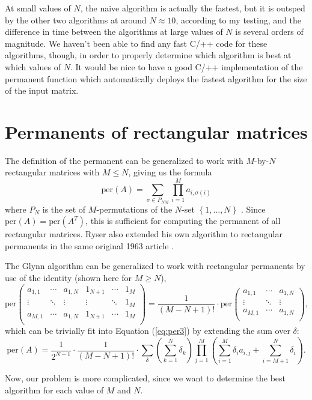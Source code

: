 \documentclass{article}
\begin{document}
At small values of $N$, the naive algorithm is actually the fastest, but it is outsped by the other
two algorithms at around $N \approx 10$, according to my testing, and the difference in time between
the algorithms at large values of $N$ is several orders of magnitude. We haven't been able to find
any fast C/++ code for these algorithms, though, in order to properly determine which algorithm is
best at which values of $N$. It would be nice to have a good C/++ implementation of the permanent
function which automatically deploys the fastest algorithm for the size of the input matrix.

\section*{Permanents of rectangular matrices}

The definition of the permanent can be generalized to work with $M$-by-$N$ rectangular
matrices with $M \leq N$, giving us the formula
\begin{equation} \label{eq:rectper1}
    \text{per}(A) = \sum_{\sigma \in P_{NM}}{\prod_{i=1}^M{a_{i,{\sigma(i)}}}}
\end{equation}
where $P_N$ is the set of $M$-permutations of the $N$-set $\left\{1,\dots,N\right\}$ \cite{wiki:permanent}.
Since $\text{per}(A) = \text{per}(A^T)$, this is sufficient for computing the permanent of all
rectangular matrices. Ryser also extended his own algorithm to rectangular permanents in the same
original 1963 article \cite{wiki:computing,ryser1963}.

The Glynn algorithm can be generalized to work with rectangular permanents by use of the
identity (shown here for $M \geq N$),
\begin{equation}
    {\text{per}}\left(
        \begin{matrix}
            a_{1,1} & \cdots & a_{1,N} & 1_{N+1} & \cdots & 1_M \\
            \vdots & \ddots & \vdots & \vdots & \ddots & 1_M \\
            a_{M,1} & \cdots & a_{1,N} & 1_{N+1} & \cdots & 1_M \\
        \end{matrix}
    \right)
    = \frac{1}{\left(M - N + 1\right)!} \cdot {\text{per}}\left(
        \begin{matrix}
            a_{1,1} & \cdots & a_{1,N} \\
            \vdots & \ddots & \vdots \\
            a_{M,1} & \cdots & a_{1,N} \\
        \end{matrix}
    \right),
\end{equation}
which can be trivially fit into Equation (\ref{eq:per3}) by extending the sum over $\delta$:
\begin{equation} \label{eq:rectper3}
    \text{per}(A) = \frac{1}{2^{N-1}} \cdot \frac{1}{\left(M - N + 1\right)!} \cdot \sum_{\delta}{
        \left(\sum_{k=1}^N{\delta_k}\right)
        \prod_{j=1}^M{\left(\sum_{i=1}^M{\delta_i a_{i,j}} + \sum_{i=M+1}^N{\delta_i}\right)}
    }.
\end{equation}

Now, our problem is more complicated, since we want to determine the best algorithm for each value
of $M$ and $N$.



\end{document}
